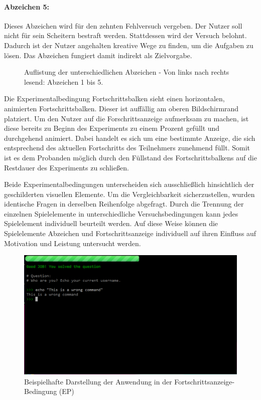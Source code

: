 \paragraph{Abzeichen 5:}
Dieses Abzeichen wird für den zehnten Fehlversuch vergeben. Der Nutzer soll nicht für sein Scheitern bestraft werden. Stattdessen wird der Versuch belohnt. Dadurch ist der Nutzer angehalten kreative Wege zu finden, um die Aufgaben zu lösen. Das Abzeichen fungiert damit indirekt als Zielvorgabe.


\begin{figure}[htbp]
    \centering
    
    
    
    
    
    \caption[Auflistung der unterschiedlichen Abzeichen]{Auflistung der unterschiedlichen Abzeichen - Von links nach rechts lesend: Abzeichen 1 bis 5.}
\end{figure}


Die Experimentalbedingung Fortschrittsbalken sieht einen horizontalen, animierten Fortschrittsbalken. Dieser ist auffällig am oberen Bildschirmrand platziert. Um den Nutzer auf die Forschrittsanzeige aufmerksam zu machen, ist diese bereits zu Beginn des Experiments zu einem Prozent gefüllt und durchgehend animiert. Dabei handelt es sich um eine bestimmte Anzeige, die sich entsprechend des aktuellen Fortschritts des Teilnehmers zunehmend füllt. Somit ist es dem Probanden möglich durch den Füllstand des Fortschrittsbalkens auf die Restdauer des Experiments zu schließen.

Beide Experimentalbedingungen unterscheiden sich ausschließlich hinsichtlich der geschilderten visuellen Elemente. Um die Vergleichbarkeit sicherzustellen, wurden identische Fragen in derselben Reihenfolge abgefragt. Durch die Trennung der einzelnen Spielelemente in unterschiedliche Versuchsbedingungen kann jedes Spielelement individuell beurteilt werden. Auf diese Weise können die Spielelemente Abzeichen und Fortschrittsanzeige individuell auf ihren Einfluss auf Motivation und Leistung untersucht werden.

\begin{figure}[htbp]
    \centering
    \includegraphics[width=\textwidth]{img/full_web.png}
    \caption{Beispielhafte Darstellung der Anwendung in der Fortschrittsanzeige-Bedingung (EP)}
\end{figure}

